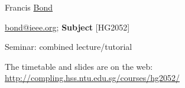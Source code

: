 \documentclass[a4paper,landscape,headrule,footrule,xetex]{foils}
\begin{document}


\begin{description}
\item [Coordinator]  Francis \ul{Bond}
\item [Email] \url{bond@ieee.org}; \textbf{Subject} [HG2052]
\item[*] Seminar: combined lecture/tutorial
  \item The timetable and slides are on the web: \url{http://compling.hss.ntu.edu.sg/courses/hg2052/}
\end{description}


\end{document}
